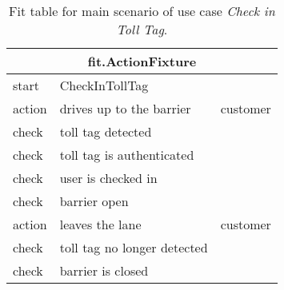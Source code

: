 \begin{table}[H]
\begin{centering}
\begin{tabular}{|l|l|l|}
\hline \multicolumn{3}{|c|}{fit.ActionFixture} \tabularnewline
\hline start & \multicolumn{1}{l}{CheckInTollTag} & \tabularnewline
\hline action & drives up to the barrier & customer \tabularnewline
\hline check & \multicolumn{1}{l}{toll tag detected} & \tabularnewline
\hline check & \multicolumn{1}{l}{toll tag is authenticated} & \tabularnewline
\hline check & \multicolumn{1}{l}{user is checked in} & \tabularnewline
\hline check & \multicolumn{1}{l}{barrier open} & \tabularnewline
\hline action & leaves the lane & customer \tabularnewline
\hline check & \multicolumn{1}{l}{toll tag no longer detected} & \tabularnewline
\hline check & \multicolumn{1}{l}{barrier is closed} & \tabularnewline
\hline 
\end{tabular}
\end{centering}
\caption{Fit table for main scenario of use case \emph{Check in Toll Tag}.}
\end{table}

